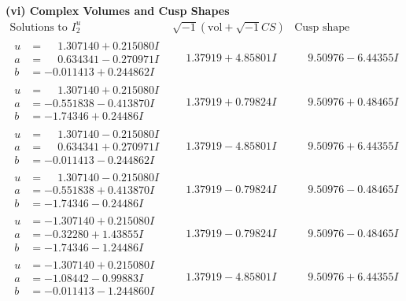 \documentclass[1p]{elsarticle_modified}
\theoremstyle{definition}
\newcommand{\I}{\sqrt{-1}}
\begin{document}
\newpage\flushleft \textbf{(vi) Complex Volumes and Cusp Shapes}
$$\begin{array}{c|c|c}  
\text{Solutions to }I^u_{2}& \I (\text{vol} + \sqrt{-1}CS) & \text{Cusp shape}\\
 \hline 
\begin{aligned}
u &= \phantom{-}1.307140 + 0.215080 I \\
a &= \phantom{-}0.634341 - 0.270971 I \\
b &= -0.011413 + 0.244862 I\end{aligned}
 & \phantom{-}1.37919 + 4.85801 I & \phantom{-}9.50976 - 6.44355 I \\ \hline\begin{aligned}
u &= \phantom{-}1.307140 + 0.215080 I \\
a &= -0.551838 - 0.413870 I \\
b &= -1.74346 + 0.24486 I\end{aligned}
 & \phantom{-}1.37919 + 0.79824 I & \phantom{-}9.50976 + 0.48465 I \\ \hline\begin{aligned}
u &= \phantom{-}1.307140 - 0.215080 I \\
a &= \phantom{-}0.634341 + 0.270971 I \\
b &= -0.011413 - 0.244862 I\end{aligned}
 & \phantom{-}1.37919 - 4.85801 I & \phantom{-}9.50976 + 6.44355 I \\ \hline\begin{aligned}
u &= \phantom{-}1.307140 - 0.215080 I \\
a &= -0.551838 + 0.413870 I \\
b &= -1.74346 - 0.24486 I\end{aligned}
 & \phantom{-}1.37919 - 0.79824 I & \phantom{-}9.50976 - 0.48465 I \\ \hline\begin{aligned}
u &= -1.307140 + 0.215080 I \\
a &= -0.32280 + 1.43855 I \\
b &= -1.74346 - 1.24486 I\end{aligned}
 & \phantom{-}1.37919 - 0.79824 I & \phantom{-}9.50976 - 0.48465 I \\ \hline\begin{aligned}
u &= -1.307140 + 0.215080 I \\
a &= -1.08442 - 0.99883 I \\
b &= -0.011413 - 1.244860 I\end{aligned}
 & \phantom{-}1.37919 - 4.85801 I & \phantom{-}9.50976 + 6.44355 I \\ \hline\begin{aligned}

\end{aligned}
\end{array}$$
\end{document}
